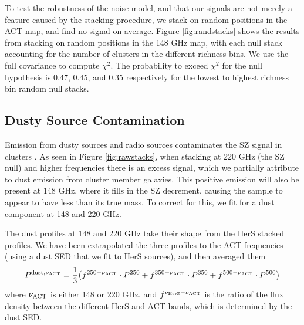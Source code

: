 \documentclass[a4paper,fleqn,usenatbib]{mnras}
\newcommand{\revisit}{\textcolor{red}}
\begin{document}
To test the robustness of the noise model, and that our signals are not merely a feature caused by the stacking procedure, we stack on random positions in the ACT map, and find no signal on average. 
Figure \ref{fig:randstacks} shows the results from stacking on random positions in the 148 GHz map, with each null stack accounting for the number of clusters in the different richness bins.   %
We use the full covariance to compute $\chi^2$.  The probability to exceed $\chi^2$ for the null hypothesis is 0.47, 0.45, and 0.35 respectively for the lowest to highest richness bin random null stacks.  


\subsection{Dusty Source Contamination}
\label{sec:dustprof}
Emission from dusty sources and radio sources contaminates the SZ signal in clusters \citep{2005A&A...439..901A}. As seen in Figure \ref{fig:rawstacks}, when stacking at 220 GHz (the SZ null) and higher frequencies there is an excess signal, which we partially attribute to dust emission from cluster member galaxies. 
This positive emission will also be present at 148 GHz, where it fills in the SZ decrement, causing the sample to appear to have less than its true mass. 
To correct for this, we fit for a dust component at 148 and 220 GHz.  

The dust profiles at 148 and 220 GHz take their shape from the HerS stacked profiles.  We have been extrapolated the three profiles to the ACT frequencies (using a dust SED that we fit to HerS sources), and then averaged them
\begin{equation}
    P^{\rm dust,\nu_{\rm ACT}} = \frac{1}{3} \big ( f^{250-\nu_{\rm ACT}} \cdot P^{250} + f^{350-\nu_{\rm ACT}} \cdot P^{350} + f^{500-\nu_{\rm ACT}} \cdot P^{500} \big )
\end{equation}
where $\nu_{\rm ACT}$ is either 148 or 220 GHz, and $f^{\nu_{\rm HerS}-\nu_{\rm ACT}}$ is the ratio of the flux density between the different HerS and ACT bands, which is determined by the dust SED.
\end{document}
